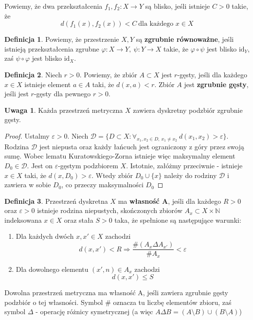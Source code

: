 \documentclass[licencjacka]{pracamgr}
\theoremstyle{definition}
\newtheorem{definition}{Definicja}[section]
\theoremstyle{definition}
\newtheorem{remark}{Uwaga}[section]
\theoremstyle{definition}
\theoremstyle{definition}
\theoremstyle{definition}
\theoremstyle{plain}
\theoremstyle{plain}
\begin{document}
Powiemy, że dwa przekształcenia $ f_1, f_2 : X \rightarrow Y $ są blisko, 
jeśli istnieje $ C > 0 $ takie, że $$ d(f_1(x), f_2(x)) < C  ~ \text{dla każdego } x \in X$$ 
\begin{definition}
	Powiemy, że przestrzenie $ X,Y $ są \textbf{zgrubnie równoważne}, jeśli 
	istnieją przekształcenia zgrubne $ \varphi : X \rightarrow Y, 
	~ \psi : Y \rightarrow X  $ takie, że 
	$ \varphi \circ \psi $ jest blisko $ \text{id}_Y $, zaś $ \psi \circ \varphi $ jest blisko 
	$ \text{id}_X $.
\end{definition}

\begin{definition}
	Niech $ r > 0$. Powiemy, że
	zbiór $ A \subset X $ jest $ r $-gęsty, jeśli dla każdego $ x \in X $ istnieje 
	element $ a \in A $ taki, że $ d(x,a) < r $. Zbiór $ A $ jest \textbf{zgrubnie gęsty}, 
	jeśli jest $ r $-gęsty dla pewnego $ r > 0 $.
\end{definition}

\begin{remark}
	Każda przestrzeń metryczna $ X $ zawiera dyskretny podzbiór zgrubnie gęsty.
\end{remark}
\begin{proof}
	Ustalmy $ \varepsilon > 0 $. Niech $ \mathcal{D} = \{D \subset X : \forall_{x_1, x_2 \in D, ~
	x_1 \neq x_2} ~ d(x_1, x_2) > \varepsilon \} $. Rodzina $ \mathcal{D} $ jest niepusta 
	oraz każdy łańcuch jest ograniczony z góry przez swoją sumę. Wobec lematu 
	Kuratowskiego-Zorna istnieje więc maksymalny element $D_0 \in \mathcal{D}$. 
	Jest on $ \varepsilon $-gęstym podzbiorem $ X $. 
	Istotnie, załóżmy przeciwnie - istnieje $ x \in X $ taki, że 
	$ d(x, D_0) > \varepsilon $. Wtedy zbiór $ D_0 \cup \{x\} $ należy do rodziny 
	$ \mathcal{D} $ i zawiera w sobie $ D_0 $, co przeczy maksymalności $ D_0 $
\end{proof}

\begin{definition}\label{def:propA}
	Przestrzeń dyskretna $ X $ ma \textbf{własność A}, jeśli dla każdego $ R>0 $ oraz 
	$ \varepsilon > 0 $ istnieje rodzina niepustych, skończonych zbiorów $ A_x \subset 
	X \times \mathbb{N} $ indeksowana $ x \in X $ oraz stała $ S > 0 $ taka, że 
	spełnione są następujące warunki:
	\begin{enumerate}
		\item Dla każdych dwóch $ x,x' \in X $ zachodzi
		$$ d(x,x') < R \Rightarrow \frac{\# (A_x \Delta A_{x'})}{\# A_x} < \varepsilon$$
		\item Dla dowolnego elementu $(x', n) \in A_x$ zachodzi $$ d(x,x') \leq S $$
	\end{enumerate}
	Dowolna przestrzeń metryczna ma własność A, jeśli zawiera zgrubnie gęsty podzbiór 
	o tej własności. Symbol $ \# $ oznacza tu liczbę elementów zbioru, zaś symbol 
	$ \Delta $ - operację różnicy symetrycznej 
	(a więc $A \Delta B = (A \setminus B) \cup (B \setminus A)$)
\end{definition}
\end{document}
